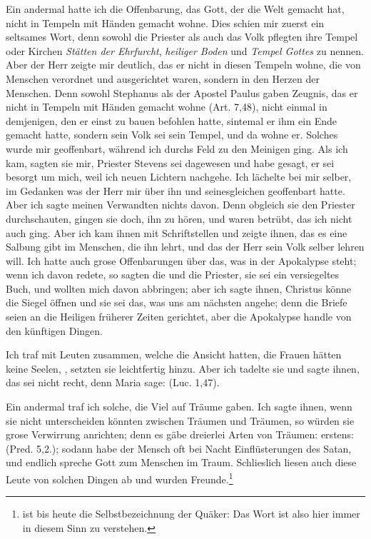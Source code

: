 Ein andermal hatte ich die Offenbarung, das Gott, der die
Welt gemacht hat, nicht in Tempeln mit Händen gemacht wohne.
Dies schien mir zuerst ein seltsames Wort, denn sowohl die
Priester als auch das Volk pflegten ihre Tempel oder Kirchen
\textit{Stätten der Ehrfurcht}, \textit{heiliger Boden} und \textit{Tempel Gottes}
zu nennen. Aber der Herr zeigte mir deutlich, das er nicht
in diesen Tempeln wohne, die von Menschen verordnet und
ausgerichtet waren, sondern in den Herzen der Menschen. Denn
sowohl Stephanus als der Apostel Paulus gaben Zeugnis,
das er nicht in Tempeln mit Händen gemacht wohne (Art. 7,48),
nicht einmal in demjenigen, den er einst zu bauen befohlen hatte,
sintemal er ihm ein Ende gemacht hatte, sondern sein Volk sei
sein Tempel, und da wohne er. Solches wurde mir geoffenbart,
während ich durchs Feld zu den Meinigen ging. Als ich kam,
sagten sie mir, Priester Stevens sei dagewesen und habe gesagt,
er sei besorgt um mich, weil ich neuen Lichtern nachgehe. Ich
lächelte bei mir selber, im Gedanken was der Herr mir über ihn
und seinesgleichen geoffenbart hatte. Aber ich sagte meinen 
Verwandten nichts davon. Denn obgleich sie den Priester durchschauten, 
gingen sie doch, ihn zu hören, und waren betrübt, das
ich nicht auch ging. Aber ich kam ihnen mit Schriftstellen und
zeigte ihnen, das es eine Salbung gibt im Menschen, die ihn
lehrt, und das der Herr sein Volk selber lehren will. Ich hatte
auch grose Offenbarungen über das, was in der Apokalypse steht;
wenn ich davon redete, so sagten die  und die Priester,
sie sei ein versiegeltes Buch, und wollten mich davon abbringen;
aber ich sagte ihnen, Christus könne die Siegel öffnen und sie
sei das, was uns am nächsten angehe; denn die Briefe seien an
die Heiligen früherer Zeiten gerichtet, aber die Apokalypse handle
von den künftigen Dingen.

Ich traf mit Leuten zusammen, welche die Ansicht hatten,
die Frauen hätten keine Seelen, ,
setzten sie leichtfertig hinzu. Aber ich tadelte sie und sagte ihnen,
das sei nicht recht, denn Maria sage:  (Luc. 1,47).

Ein andermal traf ich solche, die Viel auf Träume gaben.
Ich sagte ihnen, wenn sie nicht unterscheiden könnten zwischen
Träumen und Träumen, so würden sie grose Verwirrung anrichten; 
denn es gäbe dreierlei Arten von Träumen: erstens:
 (Pred. 5,2.); sodann habe der
Mensch oft bei Nacht Einflüsterungen des Satan, und endlich
spreche Gott zum Menschen im Traum. Schlieslich liesen auch
diese Leute von solchen Dingen ab und wurden Freunde.\footnote{ 
ist bis heute die Selbstbezeichnung der Quäker: Das Wort
 ist also hier immer in diesem Sinn zu verstehen.}

